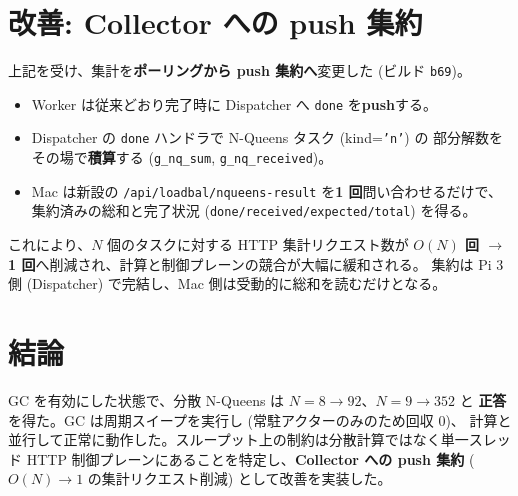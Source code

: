 \documentclass[a4paper,11pt]{ltjsarticle}
\begin{document}
\section{改善: Collector への push 集約}
上記を受け、集計を\textbf{ポーリングから push 集約へ}変更した (ビルド \texttt{b69})。
\begin{itemize}
  \item Worker は従来どおり完了時に Dispatcher へ \texttt{done} を\textbf{push}する。
  \item Dispatcher の \texttt{done} ハンドラで N-Queens タスク (kind=\texttt{'n'}) の
        部分解数をその場で\textbf{積算}する (\texttt{g\_nq\_sum},
        \texttt{g\_nq\_received})。
  \item Mac は新設の \texttt{/api/loadbal/nqueens-result} を\textbf{1 回}問い合わせるだけで、
        集約済みの総和と完了状況 (\texttt{done/received/expected/total}) を得る。
\end{itemize}
これにより、$N$ 個のタスクに対する HTTP 集計リクエスト数が
\textbf{$O(N)$ 回 $\rightarrow$ 1 回}へ削減され、計算と制御プレーンの競合が大幅に緩和される。
集約は Pi 3 側 (Dispatcher) で完結し、Mac 側は受動的に総和を読むだけとなる。

\section{結論}
GC を有効にした状態で、分散 N-Queens は $N=8 \to 92$、$N=9 \to 352$ と
\textbf{正答}を得た。GC は周期スイープを実行し (常駐アクターのみのため回収 0)、
計算と並行して正常に動作した。スループット上の制約は分散計算ではなく単一スレッド
HTTP 制御プレーンにあることを特定し、\textbf{Collector への push 集約}
($O(N)\to1$ の集計リクエスト削減) として改善を実装した。
\end{document}
